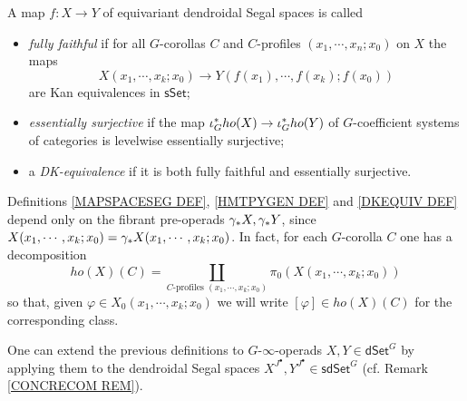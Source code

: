 \documentclass[a4paper,10pt
 ,draft
]{article}%
\begin{document}
\begin{definition}\label{DKEQUIV DEF}
	A map $f \colon X \to Y$ of equivariant dendroidal Segal spaces is called 
\begin{itemize}
	\item \textit{fully faithful} if for all $G$-corollas $C$ and $C$-profiles $(x_1,\cdots,x_n;x_0)$ on $X$ the maps
\[
	X(x_1,\cdots,x_k;x_0) \to
	Y\left(f(x_1),\cdots,f(x_k);f(x_0)\right)
\]
are Kan equivalences in $\mathsf{sSet}$;
	\item \textit{essentially surjective} if
              the map $\iota_G^{\**}ho(X) \to \iota_G^{\**}ho(Y)$
              of $G$-coefficient systems of categories is levelwise essentially surjective;
	\item a \textit{DK-equivalence} if it is both fully faithful and essentially surjective.
\end{itemize}
\end{definition}


\begin{remark}\label{ONLYPREOP REM}
Definitions \ref{MAPSPACESEG DEF}, \ref{HMTPYGEN DEF} and \ref{DKEQUIV DEF} depend only on the 
fibrant pre-operads $\gamma_{\**}X,\gamma_{\**}Y$,
since $X(x_1,\cdots,x_k;x_0) = \gamma_{\**}X(x_1,\cdots,x_k;x_0)$.
In fact, for each $G$-corolla $C$
one has a decomposition
\[
	ho(X)(C)=
	\coprod_{\text{$C$-profiles }(x_1,\cdots,x_k;x_0)}
	\pi_0 \left( X(x_1,\cdots,x_k;x_0) \right)
\]
so that, given $\varphi \in X_0(x_1,\cdots,x_k;x_0)$
we will write $[\varphi] \in ho(X)(C)$
for the corresponding class.
\end{remark}

\begin{remark}
	One can extend the previous definitions to $G$-$\infty$-operads $X,Y \in \mathsf{dSet}^G$
	by applying them to the dendroidal Segal spaces
	$X^{J^{\bullet}},Y^{J^{\bullet}} \in \mathsf{sdSet}^G$
	(cf. Remark \ref{CONCRECOM REM}). 
\end{remark}
\end{document}
